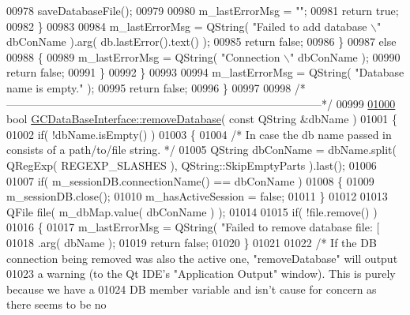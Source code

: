 \begin{DoxyCode}
{{{{{{{{{{{{{{{{{{{{{{{{{{{{{{{{{{00978         saveDatabaseFile();
00979 
00980         m\_lastErrorMsg = \textcolor{stringliteral}{""};
00981         \textcolor{keywordflow}{return} \textcolor{keyword}{true};
00982       \}
00983 
00984       m\_lastErrorMsg = QString( \textcolor{stringliteral}{"Failed to add database \(\backslash\)"%
      dbConName ).arg( db.lastError().text() );
00985       \textcolor{keywordflow}{return} \textcolor{keyword}{false};
00986     \}
00987     \textcolor{keywordflow}{else}
00988     \{
00989       m\_lastErrorMsg = QString( \textcolor{stringliteral}{"Connection \(\backslash\)"%
      dbConName );
00990       \textcolor{keywordflow}{return} \textcolor{keyword}{false};
00991     \}
00992   \}
00993 
00994   m\_lastErrorMsg = QString( \textcolor{stringliteral}{"Database name is empty."} );
00995   \textcolor{keywordflow}{return} \textcolor{keyword}{false};
00996 \}
00997 
00998 \textcolor{comment}{/*
      --------------------------------------------------------------------------------------*/}
00999 
\hypertarget{gcdatabaseinterface_8cpp_source_l01000}{}\hyperlink{class_g_c_data_base_interface_a86dcb92e64a35e3fb72fa58a4bacc3b9}{01000} \textcolor{keywordtype}{bool} \hyperlink{class_g_c_data_base_interface_a86dcb92e64a35e3fb72fa58a4bacc3b9}{GCDataBaseInterface::removeDatabase}( \textcolor{keyword}{const} QString &dbName )
01001 \{
01002   \textcolor{keywordflow}{if}( !dbName.isEmpty() )
01003   \{
01004     \textcolor{comment}{/* In case the db name passed in consists of a path/to/file string. */}
01005     QString dbConName = dbName.split( QRegExp( REGEXP\_SLASHES ), 
      QString::SkipEmptyParts ).last();
01006 
01007     \textcolor{keywordflow}{if}( m\_sessionDB.connectionName() == dbConName )
01008     \{
01009       m\_sessionDB.close();
01010       m\_hasActiveSession = \textcolor{keyword}{false};
01011     \}
01012 
01013     QFile file( m\_dbMap.value( dbConName ) );
01014 
01015     \textcolor{keywordflow}{if}( !file.remove() )
01016     \{
01017       m\_lastErrorMsg = QString( \textcolor{stringliteral}{"Failed to remove database file: [%
01018           .arg( dbName );
01019       \textcolor{keywordflow}{return} \textcolor{keyword}{false};
01020     \}
01021 
01022     \textcolor{comment}{/* If the DB connection being removed was also the active one,
       "removeDatabase" will output}
01023 \textcolor{comment}{      a warning (to the Qt IDE's "Application Output" window).  This is purely
       because we have a}
01024 \textcolor{comment}{      DB member variable and isn't cause for concern as there seems to be no
}}}}}}}}}}}}}}}}}}}}}}}}}}}}}}}}}}}}}}
\end{DoxyCode}
